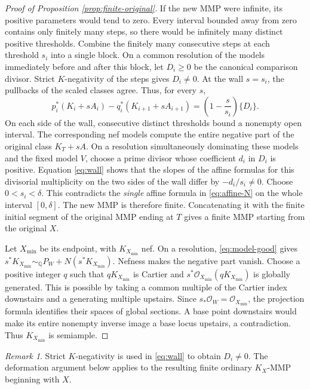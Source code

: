 \documentclass[11pt,a4paper]{article}
\theoremstyle{definition}\newtheorem{definition}[theorem]{Definition}
\theoremstyle{remark}\newtheorem*{remark}{Remark}
\newcommand{\Q}{\mathbb Q}\newcommand{\C}{\mathbb C}
\newcommand{\OO}{\mathcal O}
\begin{document}
\begin{proof}[Proof of Proposition \ref{prop:finite-original}]
If the new MMP were infinite, its positive parameters would tend to zero.
Every interval bounded away from zero contains only finitely many steps, so
there would be infinitely many distinct positive thresholds. Combine the
finitely many consecutive steps at each threshold $s_i$ into a single block.
On a common resolution of the models immediately before and after this block,
let $D_i\ge0$ be the canonical comparison divisor. Strict $K$-negativity of
the steps gives $D_i\ne0$. At the wall $s=s_i$, the pullbacks of the scaled
classes agree. Thus, for every $s$,
\begin{equation}\label{eq:wall}
 p_i^*(K_i+sA_i)-q_i^*(K_{i+1}+sA_{i+1})
   =\left(1-\frac{s}{s_i}\right)\{D_i\}.
\end{equation}
On each side of the wall, consecutive distinct thresholds bound a nonempty
open interval. The corresponding nef models compute the entire negative part
of the original class $K_T+sA$.
On a resolution simultaneously dominating these models and the fixed model
$V$, choose a prime divisor whose coefficient $d_i$ in $D_i$ is positive.
Equation \eqref{eq:wall} shows that the slopes of the affine formulas for
this divisorial multiplicity on the two sides of the wall differ by
$-d_i/s_i\ne0$. Choose $0<s_i<\delta$. This contradicts the \emph{single}
affine formula in \eqref{eq:affine-N} on the whole interval $[0,\delta]$.
The new MMP is therefore finite. Concatenating it with the finite initial
segment of the original MMP ending at $T$ gives a finite MMP starting
from the original $X$.

Let $X_{\min}$ be its endpoint, with $K_{X_{\min}}$ nef.
On a resolution, \eqref{eq:model-good} gives
$s^*K_{X_{\min}}\sim_\Q P_W+N(s^*K_{X_{\min}})$.
Nefness makes the negative part vanish. Choose a positive integer $q$ such
that $qK_{X_{\min}}$ is Cartier and
$s^*\OO_{X_{\min}}(qK_{X_{\min}})$ is globally generated.
This is possible by taking a common multiple of the Cartier index downstairs
and a generating multiple upstairs. Since $s_*\OO_W=\OO_{X_{\min}}$,
the projection formula identifies their spaces of global sections.
A base point downstairs would make its entire nonempty inverse image a base
locus upstairs, a contradiction. Thus $K_{X_{\min}}$ is semiample.
\end{proof}

\begin{remark}
Strict $K$-negativity is used in \eqref{eq:wall} to obtain $D_i\ne0$.
The deformation argument below applies to the resulting finite ordinary
$K_X$-MMP beginning with $X$.
\end{remark}
\end{document}
